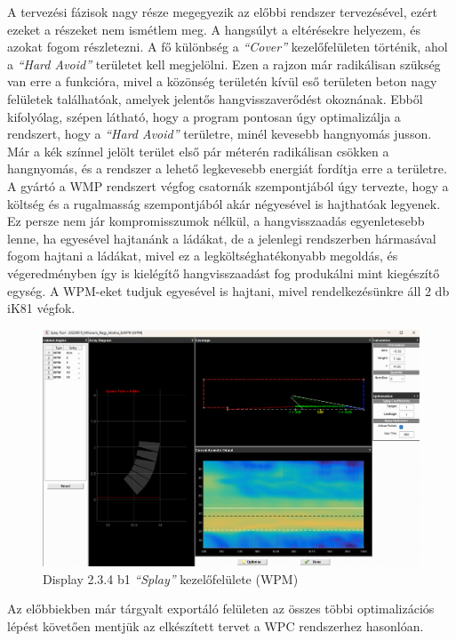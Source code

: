 A tervezési fázisok nagy része megegyezik az előbbi rendszer tervezésével, ezért ezeket a részeket nem ismétlem meg.
A hangsúlyt a eltérésekre helyezem, és azokat fogom részletezni.
A fő különbség a \textit{``Cover''} kezelőfelületen történik, ahol a \textit{``Hard Avoid''} területet kell megjelölni.
Ezen a rajzon már radikálisan szükség van erre a funkcióra, mivel a közönség területén kívül eső területen beton nagy felületek találhatóak,
amelyek jelentős hangvisszaverődést okoznának. 
Ebből kifolyólag, szépen látható, hogy a program pontosan úgy optimalizálja a rendszert, hogy a \textit{``Hard Avoid''} területre, minél kevesebb
hangnyomás jusson.
Már a kék színnel jelölt terület első pár méterén radikálisan csökken a hangnyomás, és a rendszer a lehető legkevesebb energiát fordítja erre a területre.
A gyártó a WMP rendszert végfog csatornák szempontjából úgy tervezte, hogy a költség és a rugalmasság szempontjából akár négyesével is hajthatóak legyenek.
Ez persze nem jár kompromisszumok nélkül, a hangvisszaadás egyenletesebb lenne, ha egyesével hajtanánk a ládákat, de a jelenlegi rendszerben
hármasával fogom hajtani a ládákat, mivel ez a legköltséghatékonyabb megoldás, és végeredményben így is kielégítő hangvisszaadást fog produkálni mint 
kiegészítő egység. A WPM-eket tudjuk egyesével is hajtani, mivel rendelkezésünkre áll 2 db iK81 végfok.
\begin{figure}[H]
	\centering
	\includegraphics[width=\textwidth, keepaspectratio]{figures/display_wpm_2.png}
	\caption{Display 2.3.4 b1 \textit{``Splay''} kezelőfelülete (WPM)}\label{fig:display_wpm_2}
\end{figure}
Az előbbiekben már tárgyalt exportáló felületen az összes többi optimalizációs lépést követően
mentjük az elkészített tervet a WPC rendszerhez hasonlóan.

